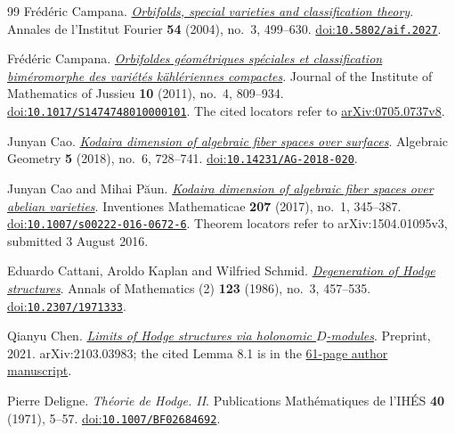 \begin{thebibliography}{99}
Fr{\'e}d{\'e}ric Campana.
\emph{\href{https://www.numdam.org/item/10.5802/aif.2027/}{Orbifolds, special varieties and classification theory}}.
Annales de l'Institut Fourier \textbf{54} (2004), no.~3, 499--630.
\href{https://doi.org/10.5802/aif.2027}{doi:\nolinkurl{10.5802/aif.2027}}.

Fr{\'e}d{\'e}ric Campana.
\emph{\href{https://arxiv.org/abs/0705.0737v8}{Orbifoldes g{\'e}om{\'e}triques sp{\'e}ciales et classification bim{\'e}romorphe des vari{\'e}t{\'e}s k{\"a}hl{\'e}riennes compactes}}.
Journal of the Institute of Mathematics of Jussieu \textbf{10} (2011), no.~4, 809--934.
\href{https://doi.org/10.1017/S1474748010000101}{doi:\nolinkurl{10.1017/S1474748010000101}}.
The cited locators refer to \href{https://arxiv.org/abs/0705.0737v8}{arXiv:0705.0737v8}.

Junyan Cao.
\emph{\href{https://content.algebraicgeometry.nl/2018-6/2018-6-020.pdf}{{Kodaira} dimension of algebraic fiber spaces over surfaces}}.
Algebraic Geometry \textbf{5} (2018), no.~6, 728--741.
\href{https://doi.org/10.14231/AG-2018-020}{doi:\nolinkurl{10.14231/AG-2018-020}}.

Junyan Cao and Mihai P{\u a}un.
\emph{\href{https://arxiv.org/abs/1504.01095v3}{{Kodaira} dimension of algebraic fiber spaces over abelian varieties}}.
Inventiones Mathematicae \textbf{207} (2017), no.~1, 345--387.
\href{https://doi.org/10.1007/s00222-016-0672-6}{doi:\nolinkurl{10.1007/s00222-016-0672-6}}.
Theorem locators refer to arXiv:1504.01095v3, submitted 3 August 2016.

Eduardo Cattani, Aroldo Kaplan and Wilfried Schmid.
\emph{\href{https://annals.math.princeton.edu/1986/123-3/p02}{Degeneration of {Hodge} structures}}.
Annals of Mathematics (2) \textbf{123} (1986), no.~3, 457--535.
\href{https://doi.org/10.2307/1971333}{doi:\nolinkurl{10.2307/1971333}}.

Qianyu Chen.
\emph{\href{https://qymath.github.io/Steenbrink.pdf}{Limits of {Hodge} structures via holonomic {$D$}-modules}}.
Preprint, 2021.
arXiv:2103.03983; the cited Lemma 8.1 is in the \href{https://qymath.github.io/Steenbrink.pdf}{61-page author manuscript}.

Pierre Deligne.
\emph{Th\'eorie de Hodge. II}.
Publications Math\'ematiques de l'IH\'ES \textbf{40} (1971), 5--57.
\href{https://doi.org/10.1007/BF02684692}{doi:\nolinkurl{10.1007/BF02684692}}.


\end{thebibliography}
